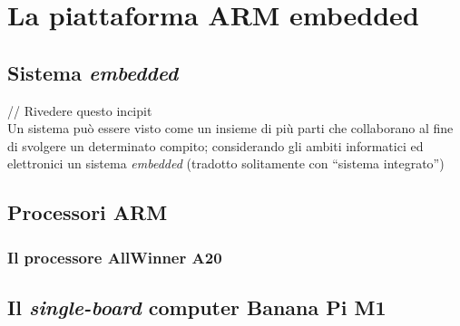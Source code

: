 
\chapter{La piattaforma ARM embedded} %

\label{Chapter5} %



\section{Sistema \emph{embedded}}

// Rivedere questo incipit \\
Un sistema può essere visto come un insieme di più parti che collaborano al fine
di svolgere un determinato compito; considerando gli  ambiti informatici ed 
elettronici un sistema \emph{embedded} (tradotto solitamente con ``sistema 
integrato'') 


\section{Processori ARM}


\subsection{Il processore AllWinner A20}


\section{Il \emph{single-board} computer Banana Pi M1}

